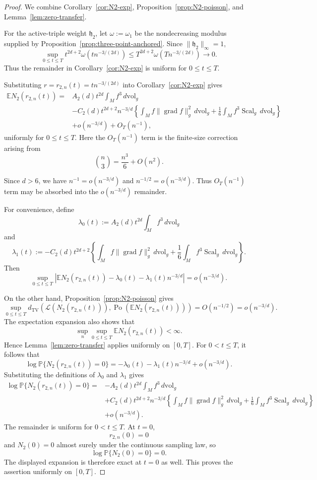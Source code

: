 \documentclass[11pt]{article}
\theoremstyle{remark}
\newcommand{\Scal}{\operatorname{Scal}}
\newcommand{\grad}{\operatorname{grad}}
\newcommand{\E}{\mathbb E}
\newcommand{\Pp}{\mathbb P}
\numberwithin{equation}{section}
\begin{document}
\begin{proof}
We combine Corollary~\ref{cor:N2-exp},
Proposition~\ref{prop:N2-poisson}, and
Lemma~\ref{lem:zero-transfer}.

For the active-triple weight \(\mathfrak h_2\), let
\(\omega:=\omega_1\) be the nondecreasing modulus supplied by
Proposition~\ref{prop:three-point-anchored}.  Since
\(\|\mathfrak h_2\|_\infty=1\),
\[
\sup_{0\le t\le T}
t^{2d+2}\omega(tn^{-3/(2d)})
\le
T^{2d+2}\omega(Tn^{-3/(2d)})
\longrightarrow0.
\]
Thus the remainder in Corollary~\ref{cor:N2-exp} is uniform for
\(0\le t\le T\).

Substituting
$r=r_{2,n}(t)=t n^{-3/(2d)}$
into Corollary~\ref{cor:N2-exp} gives
\[
\begin{aligned}
\E N_2(r_{2,n}(t))
={}&
A_2(d)t^{2d}\int_M f^3\,d\mathrm{vol}_g\\
&-
C_2(d)t^{2d+2}n^{-3/d}
\left\{
\int_M f\|\grad f\|_g^2\,d\mathrm{vol}_g
+
\frac16\int_M f^3\Scal_g\,d\mathrm{vol}_g
\right\}\\
&+
o(n^{-3/d})
+
O_T(n^{-1}),
\end{aligned}
\]
uniformly for \(0\le t\le T\).  Here the \(O_T(n^{-1})\) term is the
finite-size correction arising from
\[
\binom{n}{3}
=
\frac{n^3}{6}+O(n^2).
\]

Since \(d>6\), we have
$n^{-1}=o(n^{-3/d})$ and $n^{-1/2}=o(n^{-3/d})$.
Thus \(O_T(n^{-1})\) term may be absorbed into the
\(o(n^{-3/d})\) remainder.

For convenience, define
\[
\lambda_0(t)
:=
A_2(d)t^{2d}\int_M f^3\,d\mathrm{vol}_g
\]
and
\[
\lambda_1(t)
:=
-C_2(d)t^{2d+2}
\left\{
\int_M f\|\grad f\|_g^2\,d\mathrm{vol}_g
+
\frac16\int_M f^3\Scal_g\,d\mathrm{vol}_g
\right\}.
\]
Then
\[
\sup_{0\le t\le T}
\left|
\E N_2(r_{2,n}(t))
-
\lambda_0(t)
-
\lambda_1(t)n^{-3/d}
\right|
=
o(n^{-3/d}).
\]

On the other hand, Proposition~\ref{prop:N2-poisson} gives
\[
\sup_{0\le t\le T}
d_{\mathrm{TV}}\!\left(
\mathcal L(N_2(r_{2,n}(t))),
\operatorname{Po}(\E N_2(r_{2,n}(t)))
\right)
=
O(n^{-1/2})
=
o(n^{-3/d}).
\]
The expectation expansion also shows that
\[
\sup_n\sup_{0\le t\le T}
\E N_2(r_{2,n}(t))
<
\infty.
\]
Hence Lemma~\ref{lem:zero-transfer} applies uniformly on \([0,T]\).
For \(0<t\le T\), it follows that
\[
\log\Pp\{N_2(r_{2,n}(t))=0\}
=
-\lambda_0(t)
-\lambda_1(t)n^{-3/d}
+
o(n^{-3/d}).
\]
Substituting the definitions of \(\lambda_0\) and \(\lambda_1\) gives
\[
\begin{aligned}
\log\Pp\{N_2(r_{2,n}(t))=0\}
={}&
-A_2(d)t^{2d}\int_M f^3\,d\mathrm{vol}_g\\
&+
C_2(d)t^{2d+2}n^{-3/d}
\left\{
\int_M f\|\grad f\|_g^2\,d\mathrm{vol}_g
+
\frac16\int_M f^3\Scal_g\,d\mathrm{vol}_g
\right\}\\
&+
o(n^{-3/d}).
\end{aligned}
\]
The remainder is uniform for \(0<t\le T\).
At \(t=0\),
\[
r_{2,n}(0)=0
\]
and \(N_2(0)=0\) almost surely under the continuous sampling law, so
\[
\log\Pp\{N_2(0)=0\}=0.
\]
The displayed expansion is therefore exact at \(t=0\) as well.  This proves
the assertion uniformly on \([0,T]\).
\end{proof}
\end{document}
